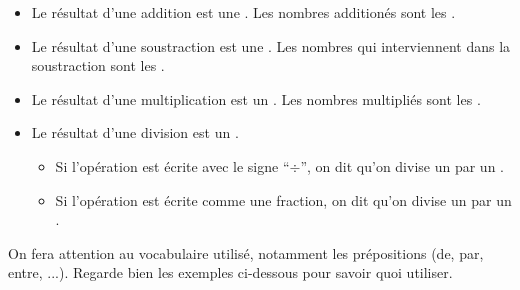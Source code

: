\documentclass[../€Cours-complet/Cours-complet]{subfiles}
\begin{document}
\maketitleCours

\begin{cours}[Vocabulaire]
	\begin{itemize}
		\item Le résultat d'une addition est une . Les nombres additionés sont les .
		\item Le résultat d'une soustraction est une . Les nombres qui interviennent dans la soustraction sont les .
		\item Le résultat d'une multiplication est un . Les nombres multipliés sont les .
		\item Le résultat d'une division est un .
		      \begin{itemize}
			      \item Si l'opération est écrite avec le signe “$÷$”, on dit qu'on divise un  par un .
			      \item Si l'opération est écrite comme une fraction, on dit qu'on divise un  par un .
		      \end{itemize}
	\end{itemize} \vspace{1em}

	On fera attention au vocabulaire utilisé, notamment les prépositions (de, par, entre, ...). Regarde bien les exemples ci-dessous pour savoir quoi utiliser.
\end{cours}
\end{document}
